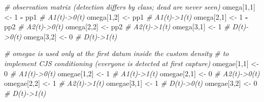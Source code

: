 \documentclass[
  12pt,
]{krantz}
\newenvironment{Shaded}{\begin{snugshade}}{\end{snugshade}}
\newcommand{\CommentTok}[1]{\textcolor[rgb]{0.56,0.35,0.01}{\textit{#1}}}
\newcommand{\DecValTok}[1]{\textcolor[rgb]{0.00,0.00,0.81}{#1}}
\newcommand{\NormalTok}[1]{#1}
\newcommand{\OtherTok}[1]{\textcolor[rgb]{0.56,0.35,0.01}{#1}}
\newcommand{\SpecialCharTok}[1]{\textcolor[rgb]{0.81,0.36,0.00}{\textbf{#1}}}
\begin{document}
\begin{Shaded}
\begin{Highlighting}[]
  \CommentTok{\# observation matrix (detection differs by class; dead are never seen)}
\NormalTok{  omega[}\DecValTok{1}\NormalTok{,}\DecValTok{1}\NormalTok{] }\OtherTok{\textless{}{-}} \DecValTok{1} \SpecialCharTok{{-}}\NormalTok{ pp1   }\CommentTok{\# A1(t){-}\textgreater{}0(t)}
\NormalTok{  omega[}\DecValTok{1}\NormalTok{,}\DecValTok{2}\NormalTok{] }\OtherTok{\textless{}{-}}\NormalTok{ pp1       }\CommentTok{\# A1(t){-}\textgreater{}1(t)}
\NormalTok{  omega[}\DecValTok{2}\NormalTok{,}\DecValTok{1}\NormalTok{] }\OtherTok{\textless{}{-}} \DecValTok{1} \SpecialCharTok{{-}}\NormalTok{ pp2   }\CommentTok{\# A2(t){-}\textgreater{}0(t)}
\NormalTok{  omega[}\DecValTok{2}\NormalTok{,}\DecValTok{2}\NormalTok{] }\OtherTok{\textless{}{-}}\NormalTok{ pp2       }\CommentTok{\# A2(t){-}\textgreater{}1(t)}
\NormalTok{  omega[}\DecValTok{3}\NormalTok{,}\DecValTok{1}\NormalTok{] }\OtherTok{\textless{}{-}} \DecValTok{1}         \CommentTok{\# D(t){-}\textgreater{}0(t)}
\NormalTok{  omega[}\DecValTok{3}\NormalTok{,}\DecValTok{2}\NormalTok{] }\OtherTok{\textless{}{-}} \DecValTok{0}         \CommentTok{\# D(t){-}\textgreater{}1(t)}
  
  \CommentTok{\# \textquotesingle{}omegae\textquotesingle{} is used only at the first datum inside the custom density}
  \CommentTok{\# to implement CJS conditioning (everyone is detected at first capture)}
\NormalTok{  omegae[}\DecValTok{1}\NormalTok{,}\DecValTok{1}\NormalTok{] }\OtherTok{\textless{}{-}} \DecValTok{0}        \CommentTok{\# A1(t){-}\textgreater{}0(t)}
\NormalTok{  omegae[}\DecValTok{1}\NormalTok{,}\DecValTok{2}\NormalTok{] }\OtherTok{\textless{}{-}} \DecValTok{1}        \CommentTok{\# A1(t){-}\textgreater{}1(t)}
\NormalTok{  omegae[}\DecValTok{2}\NormalTok{,}\DecValTok{1}\NormalTok{] }\OtherTok{\textless{}{-}} \DecValTok{0}        \CommentTok{\# A2(t){-}\textgreater{}0(t)}
\NormalTok{  omegae[}\DecValTok{2}\NormalTok{,}\DecValTok{2}\NormalTok{] }\OtherTok{\textless{}{-}} \DecValTok{1}        \CommentTok{\# A2(t){-}\textgreater{}1(t)}
\NormalTok{  omegae[}\DecValTok{3}\NormalTok{,}\DecValTok{1}\NormalTok{] }\OtherTok{\textless{}{-}} \DecValTok{1}        \CommentTok{\# D(t){-}\textgreater{}0(t)}
\NormalTok{  omegae[}\DecValTok{3}\NormalTok{,}\DecValTok{2}\NormalTok{] }\OtherTok{\textless{}{-}} \DecValTok{0}        \CommentTok{\# D(t){-}\textgreater{}1(t)}
  

\end{Highlighting}
\end{Shaded}
\end{document}
